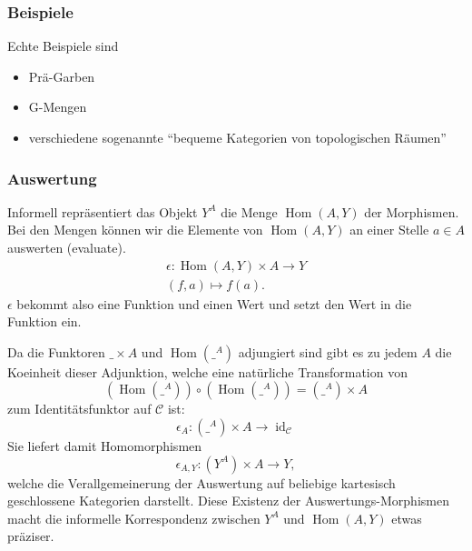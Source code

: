 \documentclass[a4paper]{amsart}
\theoremstyle{definition}
\DeclareMathOperator{\id}{id}
\DeclareMathOperator{\Hom}{Hom}
\begin{document}
\subsubsection{Beispiele}
Echte Beispiele sind
\begin{itemize}
   \item Prä-Garben
   \item G-Mengen
   \item verschiedene sogenannte "`bequeme Kategorien von topologischen Räumen"'
\end{itemize}

\subsubsection{Auswertung}
Informell repräsentiert das Objekt $Y^A$ die Menge $\Hom( A, Y )$ der Morphismen. Bei den Mengen können wir die Elemente von $\Hom( A, Y )$ an einer Stelle $a \in A$ auswerten (evaluate).
\begin{align}
   \epsilon \colon \Hom( A, Y ) \times A \to Y\\
   (f, a) \mapsto f(a).
\end{align}
$\epsilon$ bekommt also eine Funktion und einen Wert und setzt den Wert in die Funktion ein.

Da die Funktoren $\_ \times A$ und $\Hom( \_^A)$ adjungiert sind gibt es zu jedem $A$ die Koeinheit dieser Adjunktion, welche eine natürliche Transformation von
\begin{equation}
   (\Hom( \_^A)) \circ (\Hom( \_^A)) = (\_ ^A) \times A
\end{equation}
zum Identitätsfunktor auf $\mathcal{C}$ ist:
\begin{equation}
   \epsilon_{A} \colon (\_ ^A) \times A \to \id_{\mathcal{C}}
\end{equation}
Sie liefert damit Homomorphismen
\begin{equation}
   \epsilon_{A,Y} \colon (Y ^A) \times A \to Y, 
\end{equation}
welche die Verallgemeinerung der Auswertung auf beliebige kartesisch geschlossene Kategorien darstellt. Diese Existenz der Auswertungs-Morphismen macht die informelle Korrespondenz zwischen $Y^A$ und $\Hom( A, Y )$ etwas präziser.

\end{document}

